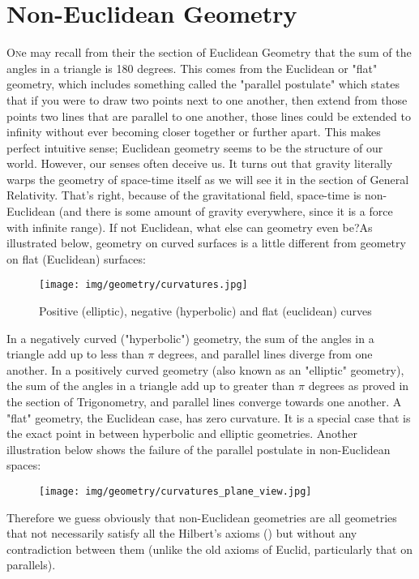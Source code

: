 	\newpage
	\thispagestyle{empty}
	\mbox{}	
	\section{Non-Euclidean Geometry}\label{non-euclidean geometry}
	\lettrine[lines=4]{\color{BrickRed}O}ne may recall from their the section of Euclidean Geometry that the sum of the angles in a triangle is 180 degrees. This comes from the Euclidean or "flat" geometry, which includes something called the "parallel postulate" which states that if you were to draw two points next to one another, then extend from those points two lines that are parallel to one another, those lines could be extended to infinity without ever becoming closer together or further apart. This makes perfect intuitive sense; Euclidean geometry seems to be the structure of our world. However, our senses often deceive us. It turns out that gravity literally warps the geometry of space-time itself as we will see it in the section of General Relativity. That's right, because of the gravitational field, space-time is non-Euclidean (and there is some amount of gravity everywhere, since it is a force with infinite range). If not Euclidean, what else can geometry even be?As illustrated below, geometry on curved surfaces is a little different from geometry on flat (Euclidean) surfaces:
	\begin{figure}[H]
		\centering
		\texttt{[image: img/geometry/curvatures.jpg]}
		\caption{Positive (elliptic), negative (hyperbolic) and flat (euclidean) curves}
	\end{figure}
	
	In a negatively curved ("hyperbolic") geometry, the sum of the angles in a triangle add up to less than $\pi$ degrees, and parallel lines diverge from one another. In a positively curved geometry (also known as an "elliptic" geometry), the sum of the angles in a triangle add up to greater than $\pi$ degrees as proved in the section of Trigonometry, and parallel lines converge towards one another. A "flat" geometry, the Euclidean case, has zero curvature. It is a special case that is the exact point in between hyperbolic and elliptic geometries. Another illustration below shows the failure of the parallel postulate in non-Euclidean spaces:
	\begin{figure}[H]
		\centering
		\texttt{[image: img/geometry/curvatures\_plane\_view.jpg]}
	\end{figure}
	
	Therefore we guess obviously that non-Euclidean geometries are all geometries that not necessarily satisfy all the Hilbert's axioms () but without any contradiction between them (unlike the old axioms of Euclid, particularly that on parallels).\\
	
